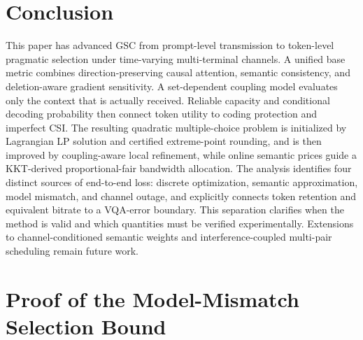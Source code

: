 \documentclass[journal]{IEEEtran}
\begin{document}
\section{Conclusion}
\label{sec:conclusion}

This paper has advanced GSC from prompt-level transmission to token-level pragmatic selection under time-varying multi-terminal channels. A unified base metric combines direction-preserving causal attention, semantic consistency, and deletion-aware gradient sensitivity. A set-dependent coupling model evaluates only the context that is actually received. Reliable capacity and conditional decoding probability then connect token utility to coding protection and imperfect CSI. The resulting quadratic multiple-choice problem is initialized by Lagrangian LP solution and certified extreme-point rounding, and is then improved by coupling-aware local refinement, while online semantic prices guide a KKT-derived proportional-fair bandwidth allocation. The analysis identifies four distinct sources of end-to-end loss: discrete optimization, semantic approximation, model mismatch, and channel outage, and explicitly connects token retention and equivalent bitrate to a VQA-error boundary. This separation clarifies when the method is valid and which quantities must be verified experimentally. Extensions to channel-conditioned semantic weights and interference-coupled multi-pair scheduling remain future work.

\appendices

\section{Proof of the Model-Mismatch Selection Bound}
\end{document}
